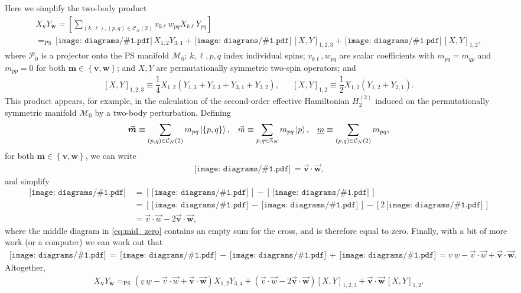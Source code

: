 \documentclass[nofootinbib,notitlepage,11pt]{revtex4-2}
\newcommand{\f}[2]{\dfrac{#1}{#2}} %
\newcommand{\p}[1]{\left(#1\right)} %
\renewcommand{\sp}[1]{\left[#1\right]} %
\renewcommand{\set}[1]{\left\{#1\right\}} %
\renewcommand{\c}{\cdot} %
\newcommand{\m}{\bm} %
\renewcommand{\v}{\vec} %
\newcommand{\1}{\mathds{1}}
\newcommand{\C}{\mathcal{C}}
\newcommand{\M}{\mathcal{M}}
\renewcommand{\P}{\mathcal{P}}
\newcommand{\ZZ}{\mathbb{Z}}
\newcommand{\EQPS}{=_{\text{PS}}}
\newcommand{\col}{\underline}
\newcommand{\diagram}[1]
{\,\texttt{[image: diagrams/\#1.pdf]}\,}
\begin{document}
Here we simplify the two-body product
\begin{multline}
  X_{\m v} Y_{\m w}
  = \sp{\sum_{\p{k,\ell},\p{p,q}\in\C_N\p{2}}
    v_{k\ell} w_{pq} X_{k\ell} Y_{pq}} \\
  \EQPS \diagram{two_body_0} X_{1,2} Y_{3,4}
  + \diagram{two_body_1} \sp{X,Y}_{1,2,3}
  + \diagram{two_body_2} \sp{X,Y}_{1,2},
\end{multline}
where $\P_0$ is a projector onto the PS manifold $\M_0$; $k,\ell,p,q$
index individual spins; $v_{k\ell},w_{pq}$ are scalar coefficients
with $m_{pq}=m_{qp}$ and $m_{pp}=0$ for both $\m m\in\set{\m v,\m w}$;
and $X,Y$ are permutationally symmetric two-spin operators; and
\begin{align}
  \sp{X,Y}_{1,2,3}
  \equiv \f14 X_{1,2}\p{Y_{1,3} + Y_{2,3} + Y_{3,1} + Y_{3,2}},
  &&
  \sp{X,Y}_{1,2} \equiv \f12 X_{1,2} \p{Y_{1,2} + Y_{2,1}}.
\end{align}
This product appears, for example, in the calculation of the
second-order effective Hamiltonian $H_2^{(2)}$ induced on the
permutationally symmetric manifold $\M_0$ by a two-body perturbation.
Defining
\begin{align}
  \v{\m m} \equiv \sum_{\p{p,q}\in\C_N\p{2}} m_{pq} \ket{\set{p,q}},
  &&
  \v m \equiv \sum_{p,q\in\ZZ_N} m_{pq} \ket{p},
  &&
  \col{m} \equiv \sum_{\p{p,q}\in\C_N\p{2}} m_{pq},
\end{align}
for both $\m m\in\set{\m v,\m w}$, we can write
\begin{align}
  \diagram{two_body_2} = \v{\m v} \c\v{\m w},
\end{align}
and simplify
\begin{align}
  \diagram{two_body_1}
  &= \sp{\diagram{two_body_1_o}} - \sp{\diagram{two_body_1_x}} \\
  &= \sp{\diagram{two_body_1_oo} - \diagram{two_body_1_ox}}
  - \sp{2\diagram{two_body_2}} \label{eq:mid_zero} \\
  &= \v v \c \v w - 2 \v{\m v} \c \v{\m w},
\end{align}
where the middle diagram in \eqref{eq:mid_zero} contains an empty sum
for the cross, and is therefore equal to zero.  Finally, with a bit of
more work (or a computer) we can work out that
\begin{align}
  \diagram{two_body_0}
  = \diagram{two_body_0_oooo} - \diagram{two_body_1_ooo}
  + \diagram{two_body_2_oo}
  = \col{v}\,\col{w} -\v v\c\v w + \v{\m v}\c\v{\m w}.
\end{align}
Altogether,
\begin{align}
  X_{\m v} Y_{\m w}
  \EQPS \p{\col{v}\,\col{w} -\v v\c\v w + \v{\m v}\c\v{\m w}}
  X_{1,2} Y_{3,4}
  + \p{\v v\c\v w - 2 \v{\m v} \c \v{\m w}} \sp{X,Y}_{1,2,3}
  + \v{\m v} \c \v{\m w}\, \sp{X,Y}_{1,2}.
\end{align}
\end{document}
